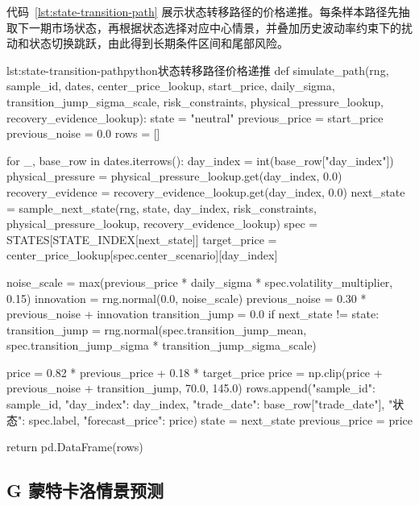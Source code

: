 代码~\ref{lst:state-transition-path} 展示状态转移路径的价格递推。每条样本路径先抽取下一期市场状态，再根据状态选择对应中心情景，并叠加历史波动率约束下的扰动和状态切换跳跃，由此得到长期条件区间和尾部风险。

\begin{paperlisting}{lst:state-transition-path}{python}{状态转移路径价格递推}
def simulate_path(rng, sample_id, dates, center_price_lookup, start_price,
                  daily_sigma, transition_jump_sigma_scale, risk_constraints,
                  physical_pressure_lookup, recovery_evidence_lookup):
    state = "neutral"
    previous_price = start_price
    previous_noise = 0.0
    rows = []

    for _, base_row in dates.iterrows():
        day_index = int(base_row["day_index"])
        physical_pressure = physical_pressure_lookup.get(day_index, 0.0)
        recovery_evidence = recovery_evidence_lookup.get(day_index, 0.0)
        next_state = sample_next_state(rng, state, day_index, risk_constraints,
                                       physical_pressure_lookup,
                                       recovery_evidence_lookup)
        spec = STATES[STATE_INDEX[next_state]]
        target_price = center_price_lookup[spec.center_scenario][day_index]

        noise_scale = max(previous_price * daily_sigma
                          * spec.volatility_multiplier, 0.15)
        innovation = rng.normal(0.0, noise_scale)
        previous_noise = 0.30 * previous_noise + innovation
        transition_jump = 0.0
        if next_state != state:
            transition_jump = rng.normal(spec.transition_jump_mean,
                                         spec.transition_jump_sigma
                                         * transition_jump_sigma_scale)

        price = 0.82 * previous_price + 0.18 * target_price
        price = np.clip(price + previous_noise + transition_jump, 70.0, 145.0)
        rows.append({"sample_id": sample_id, "day_index": day_index,
                     "trade_date": base_row["trade_date"], "状态": spec.label,
                     "forecast_price": price})
        state = next_state
        previous_price = price

    return pd.DataFrame(rows)
\end{paperlisting}

\clearpage

\subsection*{G 蒙特卡洛情景预测}

